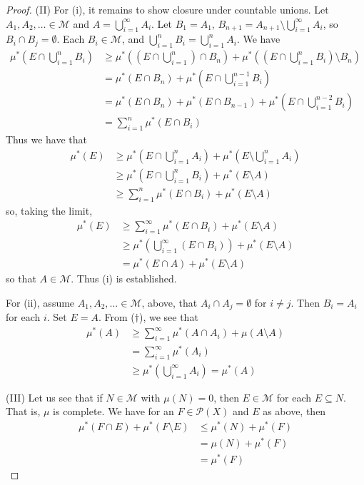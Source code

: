 \documentclass[12pt, a4paper]{memoir}
\theoremstyle{nonumberplain}
\newtheorem{proof}{Proof}
\begin{document}
\begin{proof}
    (II) For (i), it remains to show closure under countable unions.
    Let $A_1,A_2,\ldots\in\mathcal{M}$ and $A=\bigcup_{i=1}^\infty A_i$.
    Let $B_1=A_1$, $B_{n+1}=A_{n+1}\setminus\bigcup_{i=1}^\infty A_i$, so $B_i\cap B_j=\emptyset$.
    Each $B_i\in\mathcal{M}$, and $\bigcup_{i=1}^n B_i=\bigcup_{i=1}^n A_i$.
    We have
    \begin{align*}
        \mu^*(E\cap\bigcup_{i=1}^n B_i) &\geq\mu^*\left((E\cap\bigcup_{i=1}^n)\cap B_n\right)+\mu^*\left((E\cap\bigcup_{i=1}^n B_i)\setminus B_n\right)\\
                                        &= \mu^*(E\cap B_n)+\mu^*\left(E\cap\bigcup_{i=1}^{n-1}B_i\right)\\
                                        &= \mu^*(E\cap B_n)+\mu^*(E\cap B_{n-1})+\mu^*\left(E\cap\bigcup_{i=1}^{n-2}B_i\right)\\
                                        &= \sum\limits_{i=1}^n \mu^*(E\cap B_i)
    \end{align*}
    Thus we have that
    \begin{align*}
        \mu^*(E) &\geq\mu^*\left(E\cap\bigcup_{i=1}^n A_i\right)+\mu^*\left(E\setminus\bigcup_{i=1}^n A_i\right)\\
                 &\geq\mu^*\left(E\cap\bigcup_{i=1}^n B_i\right)+\mu^*(E\setminus A)\\
                 &\geq\sum\limits_{i=1}^n\mu^*(E\cap B_i)+\mu^*(E\setminus A)
    \end{align*}
    so, taking the limit,
    \begin{align*}
        \mu^*(E) &\geq\sum\limits_{i=1}^\infty\mu^*(E\cap B_i)+\mu^*(E\setminus A)\\
                 &\geq\mu^*\left(\bigcup_{i=1}^\infty(E\cap B_i)\right)+\mu^*(E\setminus A)\tag{$\dagger$}\\
                 &=\mu^*(E\cap A)+\mu^*(E\setminus A)
    \end{align*}
    so that $A\in\mathcal{M}$.
    Thus (i) is established.

    For (ii), assume $A_1,A_2,\ldots\in\mathcal{M}$, above, that $A_i\cap A_j=\emptyset$ for $i\neq j$.
    Then $B_i=A_i$ for each $i$.
    Set $E=A$.
    From ($\dagger$), we see that
    \begin{align*}
        \mu^*(A) &\geq \sum\limits_{i=1}^\infty \mu^*(A\cap A_i)+\mu(A\setminus A)\\
                 &= \sum\limits_{i=1}^\infty \mu^*(A_i)\\
                 &\geq \mu^*(\bigcup_{i=1}^\infty A_i)=\mu^*(A)
    \end{align*}

    (III) Let us see that if $N\in\mathcal{M}$ with $\mu(N)=0$, then $E\in\mathcal{M}$ for each $E\subseteq N$.
    That is, $\mu$ is complete.
    We have for an $F\in\mathcal{P}(X)$ and $E$ as above, then
    \begin{align*}
        \mu^*(F\cap E)+\mu^*(F\setminus E) &\leq \mu^*(N)+\mu^*(F)\\
                                           &= \mu(N)+\mu^*(F)\\
                                           &= \mu^*(F)
    \end{align*}
\end{proof}
\end{document}
